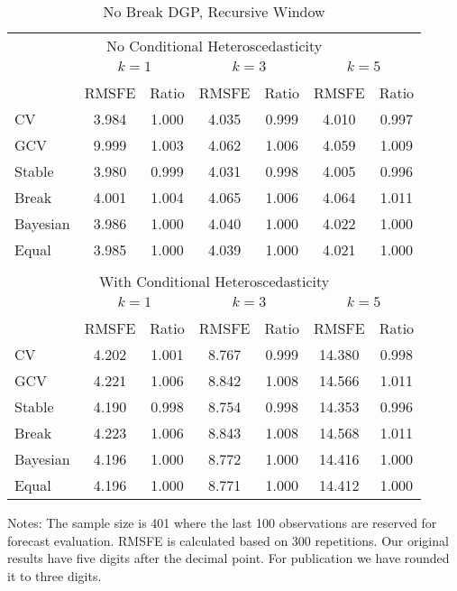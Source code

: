 \newpage
\begin{sidewaystable}
\caption{No Break DGP, Recursive Window} \label{tb:4}
\centering
\begin{adjustbox}{scale=1,keepaspectratio}
\begin{threeparttable}
\begin{tabular}{lcccccc}
\toprule
\multicolumn{7}{c}{No Conditional Heteroscedasticity}\\[0.3em]
 & \multicolumn{2}{c}{$k = 1$} & \multicolumn{2}{c}{$k = 3$} & \multicolumn{2}{c}{$k = 5$} \\
\cmidrule(r){2-3}
\cmidrule(r){4-5}
\cmidrule(r){6-7} \\
         &RMSFE &Ratio &RMSFE &Ratio &RMSFE &Ratio \\
CV       &3.984 &1.000 &4.035 &0.999 &4.010 &0.997 \\
GCV      &9.999 &1.003 &4.062 &1.006 &4.059 &1.009 \\
Stable   &3.980 &0.999 &4.031 &0.998 &4.005 &0.996 \\
Break    &4.001 &1.004 &4.065 &1.006 &4.064 &1.011 \\
Bayesian &3.986 &1.000 &4.040 &1.000 &4.022 &1.000 \\
Equal    &3.985 &1.000 &4.039 &1.000 &4.021 &1.000 \\
\\[0.3em]
\multicolumn{7}{c}{With Conditional Heteroscedasticity}\\[0.3em]
 & \multicolumn{2}{c}{$k = 1$} & \multicolumn{2}{c}{$k = 3$} & \multicolumn{2}{c}{$k = 5$} \\
\cmidrule(r){2-3}
\cmidrule(r){4-5}
\cmidrule(r){6-7} \\
         &RMSFE &Ratio &RMSFE &Ratio &RMSFE &Ratio \\
CV       &4.202 &1.001 &8.767 &0.999 &14.380 &0.998 \\
GCV      &4.221 &1.006 &8.842 &1.008 &14.566 &1.011 \\
Stable   &4.190 &0.998 &8.754 &0.998 &14.353 &0.996 \\
Break    &4.223 &1.006 &8.843 &1.008 &14.568 &1.011 \\
Bayesian &4.196 &1.000 &8.772 &1.000 &14.416 &1.000 \\
Equal    &4.196 &1.000 &8.771 &1.000 &14.412 &1.000 \\
\bottomrule
\end{tabular}
\begin{tablenotes} \footnotesize
Notes: The sample size is 401 where the last 100 observations are reserved for forecast evaluation. RMSFE is calculated based on 300 repetitions. Our original results have five digits after the decimal point. For publication we have rounded it to three digits.
\end{tablenotes}
\end{threeparttable}
\end{adjustbox}
\end{sidewaystable} 